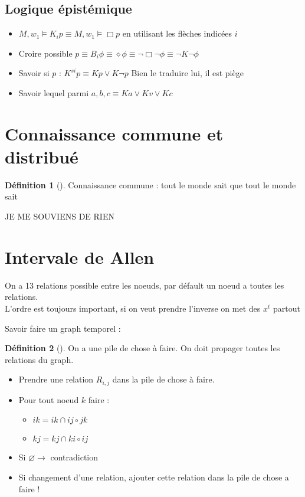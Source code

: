 \documentclass{article}
\theoremstyle{plain}%
\theoremstyle{definition}
\newtheorem{defn}{Définition}[section]
\theoremstyle{remark}
\begin{document}
\subsection{Logique épistémique}
\begin{itemize}
    \item $ M, w_1 \models K_i p \equiv M, w_1 \models \Box p $ en utilisant les flèches indicées $ i $
    \item Croire possible $ p \equiv B_i \phi \equiv \diamond \phi \equiv \neg \Box \neg \phi \equiv \neg K \neg \phi  $ 
    \item Savoir si $ p $ : $ K^{si} p \equiv K p \vee K \neg p $ Bien le traduire lui, il est piège
    \item Savoir lequel parmi $ a,b,c \equiv K a \vee K v \vee K c $ 
\end{itemize}

\section{Connaissance commune et distribué}
\begin{defn}[]
    Connaissance commune : tout le monde sait que tout le monde sait
\end{defn}
JE ME SOUVIENS DE RIEN

\section{Intervale de Allen}
On a 13 relations possible entre les noeuds, par défault un noeud a toutes les relations. \\
L'ordre est toujours important, si on veut prendre l'inverse on met des $ x^t $ partout

Savoir faire un graph temporel : 
\begin{defn}[]
    On a une pile de chose à faire. On doit propager toutes les relations du graph. 
    \begin{itemize}
        \item Prendre une relation $ R_{i,j} $ dans la pile de chose à faire.
        \item Pour tout noeud $ k $ faire : \begin{itemize}
            \item $ ik = ik \cap ij \circ jk $ 
            \item $ kj = kj \cap ki \circ ij $ 
        \end{itemize}
        \item Si $ \varnothing \rightarrow $ contradiction
        \item Si changement d'une relation, ajouter cette relation dans la pile de chose a faire ! 
    \end{itemize}
\end{defn}
\end{document}
